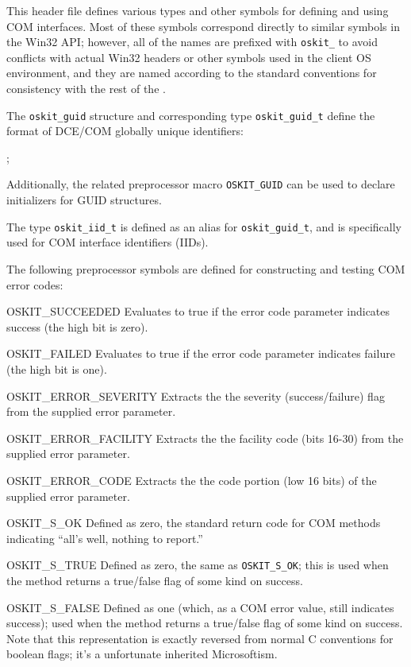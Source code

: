 \label{oskit-com-h}
\begin{apidesc}
	This header file defines
	various types and other symbols
	for defining and using COM interfaces.
	Most of these symbols correspond directly
	to similar symbols in the Win32 API;
	however, all of the names are prefixed with \texttt{oskit_}
	to avoid conflicts with actual Win32 headers
	or other symbols used in the client OS environment,
	and they are named according to the standard \oskit{} conventions
	for consistency with the rest of the \oskit.

	The \texttt{oskit_guid} structure
	and corresponding type \texttt{oskit_guid_t}
	define the format of DCE/COM globally unique identifiers:

	;

	Additionally, the related preprocessor macro \texttt{OSKIT_GUID}
	can be used to declare initializers for GUID structures.

	The type \texttt{oskit_iid_t}
	is defined as an alias for \texttt{oskit_guid_t},
	and is specifically used for COM interface identifiers (IIDs).

	The following preprocessor symbols are defined
	for constructing and testing COM error codes:
	\begin{icsymlist}
	\item[OSKIT_SUCCEEDED]
		Evaluates to true if the error code parameter
		indicates success (the high bit is zero).
	\item[OSKIT_FAILED]
		Evaluates to true if the error code parameter
		indicates failure (the high bit is one).
	\item[OSKIT_ERROR_SEVERITY]
		Extracts the the severity (success/failure) flag
		from the supplied error parameter.
	\item[OSKIT_ERROR_FACILITY]
		Extracts the the facility code (bits 16-30)
		from the supplied error parameter.
	\item[OSKIT_ERROR_CODE]
		Extracts the the code portion (low 16 bits)
		of the supplied error parameter.
	\item[OSKIT_S_OK]
		Defined as zero,
		the standard return code for COM methods
		indicating ``all's well, nothing to report.''
	\item[OSKIT_S_TRUE]
		Defined as zero, the same as \texttt{OSKIT_S_OK};
		this is used when the method returns
		a true/false flag of some kind on success.
	\item[OSKIT_S_FALSE]
		Defined as one
		(which, as a COM error value, still indicates success);
		used when the method returns
		a true/false flag of some kind on success.
		Note that this representation is exactly reversed
		from normal C conventions for boolean flags;
		it's a unfortunate inherited Microsoftism.
	\end{icsymlist}


\end{apidesc}
